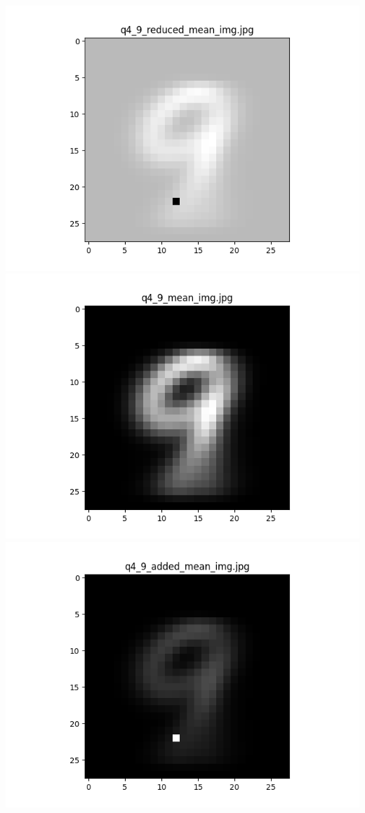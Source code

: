 \documentclass{article}
\begin{document}
    \\
    \includegraphics[scale=.37]{../results/q4/reduced_mean_images/q4_9_reduced_mean_img.png}
    \includegraphics[scale=.37]{../results/q4/mean_images/q4_9_mean_img.png}
    \includegraphics[scale=.37]{../results/q4/added_mean_images/q4_9_added_mean_img.png}
\end{document}
